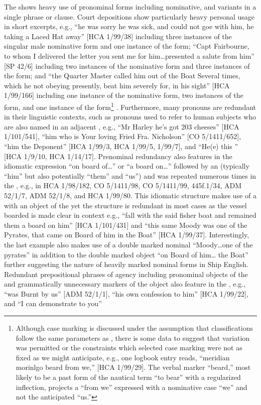 The  shows heavy use of pronominal forms including nominative,  and  variants in a single phrase or clause. Court depositions show particularly heavy personal  usage in short excerpts, e.g., “he was sorry he was sick, and could not goe with him, he taking a Laced Hat away” [HCA 1/99/38] including three instances of the singular male  nominative form and one instance of the  form; “Capt Fairbourne, to whom I delivered the letter you sent me for him…presented a salute from him” [SP 42/6] including two instances of the nominative form and three instances of the  form; and “the Quarter Master called him out of the Boat Several times, which he not obeying presently, beat him severely for, in his sight” [HCA 1/99/166] including one instance of the nominative form, two instances of the  form, and one instance of the  form\footnote{Although case marking is discussed under the assumption that classifications follow the same parameters as , there is some data to suggest that variation was permitted or the constraints which selected case marking were not as fixed as we might anticipate, e.g., one logbook entry reads, “meridian morinlgo beard from we,” [HCA 1/99/29]. The verbal marker “beard,” most likely to be a past form of the nautical term “to bear” with a regularized inflection, projects a  “from we” expressed with a nominative case  “we” and not the anticipated  “us.”} . Furthermore, many pronouns are redundant in their linguistic contexts, such as pronouns used to refer to human subjects who are also named in an adjacent , e.g., “Mr Harley he’s got 203 cheeses” [HCA 1/101/541], “him who is Your loving Fried Fra. Nicholson” [CO 5/1411/652], “him the Deponent” [HCA 1/99/3, HCA 1/99/5, 1/99/7], and “He(e) this ” [HCA 1/9/10, HCA 1/14/17]. Prenominal redundancy also features in the idiomatic expression “on board of…” or “a board on…” followed by an   (typically “him” but also potentially “them” and “us”) and was repeated numerous times in the , e.g., in HCA 1/98/182, CO 5/1411/98, CO 5/1411/99, 445f.1/34, ADM 52/1/7, ADM 52/1/8, and HCA 1/99/80. This idiomatic structure makes use of a  with an  object of the  yet the structure is redundant in most cases as the vessel boarded is made clear in context e.g., “fall with the said fisher boat and remained them a board on him” [HCA 1/101/431] and “this same Moody was one of the Pyrates, that came on Board of him in the Boat” [HCA 1/99/37]. Interestingly, the last example also makes use of a double marked nominal “Moody…one of the pyrates” in addition to the double marked object “on Board of him… the Boat” further suggesting the nature of heavily marked nominal forms in Ship English. Redundant prepositional phrases of agency including pronominal objects of the  and grammatically unnecessary markers of the  object also feature in the , e.g., “was Burnt by us” [ADM 52/1/1], “his own confession to him” [HCA 1/99/22], and “I can demonstrate to you” 